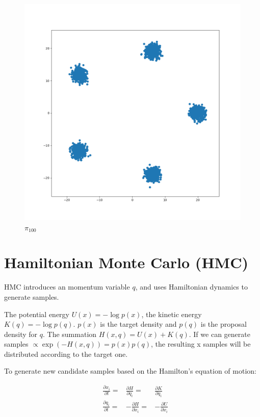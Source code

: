 \documentclass{article}
\begin{document}
\begin{figure}[h!]
\centering
\includegraphics[scale=0.3]{f100.png}
\caption{$\pi_{100}$}
\end{figure}




\newpage
\section{Hamiltonian Monte Carlo (HMC)}
HMC introduces an momentum variable $q$, and uses Hamiltonian dynamics to generate samples.


The potential energy $U(x) = -\log p(x)$, the kinetic energy $K(q) = -\log p(q)$.
$p(x)$ is the target density and $p(q)$ is the proposal density for $q$.
The summation $H(x,q) = U(x) + K(q)$. If we can generate samples $\propto \exp(-H(x,q)) = p(x)p(q)$, the resulting x samples will be distributed according to the target one.

To generate new candidate samples based on the Hamilton's equation of motion:

\begin{equation}
\begin{aligned}
& \frac{\partial x_i}{\partial t} = & \frac{\partial H}{\partial q_i} = & \frac{\partial K}{\partial q_{i}} \\
& \frac{\partial q_i}{\partial t} = & -\frac{\partial H}{\partial x_i} = & -\frac{\partial U}{\partial x_{i}}
\end{aligned}
\end{equation}
\end{document}
